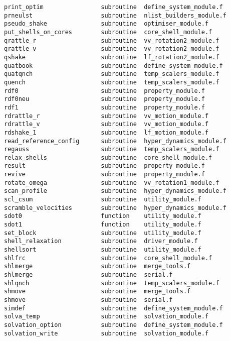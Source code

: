 \begin{verbatim}
print_optim                subroutine  define_system_module.f    
prneulst                   subroutine  nlist_builders_module.f   
pseudo_shake               subroutine  optimiser_module.f        
put_shells_on_cores        subroutine  core_shell_module.f       
qrattle_r                  subroutine  vv_rotation2_module.f     
qrattle_v                  subroutine  vv_rotation2_module.f     
qshake                     subroutine  lf_rotation2_module.f     
quatbook                   subroutine  define_system_module.f    
quatqnch                   subroutine  temp_scalers_module.f     
quench                     subroutine  temp_scalers_module.f     
rdf0                       subroutine  property_module.f         
rdf0neu                    subroutine  property_module.f         
rdf1                       subroutine  property_module.f         
rdrattle_r                 subroutine  vv_motion_module.f        
rdrattle_v                 subroutine  vv_motion_module.f        
rdshake_1                  subroutine  lf_motion_module.f        
read_reference_config      subroutine  hyper_dynamics_module.f   
regauss                    subroutine  temp_scalers_module.f     
relax_shells               subroutine  core_shell_module.f       
result                     subroutine  property_module.f         
revive                     subroutine  property_module.f         
rotate_omega               subroutine  vv_rotation1_module.f     
scan_profile               subroutine  hyper_dynamics_module.f   
scl_csum                   subroutine  utility_module.f          
scramble_velocities        subroutine  hyper_dynamics_module.f   
sdot0                      function    utility_module.f          
sdot1                      function    utility_module.f          
set_block                  subroutine  utility_module.f          
shell_relaxation           subroutine  driver_module.f           
shellsort                  subroutine  utility_module.f          
shlfrc                     subroutine  core_shell_module.f       
shlmerge                   subroutine  merge_tools.f             
shlmerge                   subroutine  serial.f                  
shlqnch                    subroutine  temp_scalers_module.f     
shmove                     subroutine  merge_tools.f             
shmove                     subroutine  serial.f                  
simdef                     subroutine  define_system_module.f    
solva_temp                 subroutine  solvation_module.f        
solvation_option           subroutine  define_system_module.f    
solvation_write            subroutine  solvation_module.f        

\end{verbatim}
